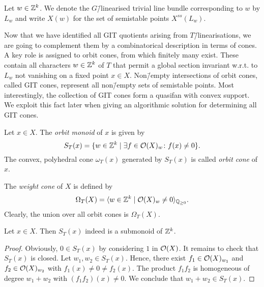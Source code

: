 \begin{notation}
	Let $w\in\mathbb{Z}^k$. We denote the $G$\=/linearised trivial line bundle corresponding to $w$ by $L_w$ and write $X(w)$ for the set of semistable points $X^{ss}(L_w)$.
\end{notation}

Now that we have identified all GIT quotients arising from $T$\=/linearisations, we are going to complement them by a combinatorical description in terms of cones. A key role is assigned to orbit cones, from which finitely many exist. These contain all characters $w\in\mathbb{Z}^k$ of $T$ that permit a global section invariant w.r.t. to $L_w$ not vanishing on a fixed point $x\in X$. Non\=/empty intersections of orbit cones, called GIT cones, represent all non\=/empty sets of semistable points. Most interestingly, the collection of GIT cones form a quasifan with convex support. We exploit this fact later when giving an algorithmic solution for determining all GIT cones.

\begin{defi}
	\label{defi:orbit_cone}
	Let $x\in X$. The \emph{orbit monoid} of $x$ is given by
	$$S_T(x) = \{w\in\mathbb{Z}^k\mid \exists f\in\mathcal{O}(X)_w\colon f(x) \neq 0\}.$$
	The convex, polyhedral cone $\omega_T(x)$ generated by $S_T(x)$ is called \emph{orbit cone} of $x$.
	
	The \emph{weight cone} of $X$ is defined by
	$$\Omega_T(X) = \langle w\in\mathbb{Z}^k\mid \mathcal{O}(X)_w \neq 0 \rangle_{\mathbb{Q}_{\geq 0}}.$$
	Clearly, the union over all orbit cones is $\Omega_T(X)$.
\end{defi}

\begin{lemma}
	Let $x\in X$. Then $S_T(x)$ indeed is a submonoid of $\mathbb{Z}^k$.
\end{lemma}
\begin{proof}
	Obviously, $0\in S_T(x)$ by considering $1$ in $\mathcal{O}(X)$. It remains to check that $S_T(x)$ is closed. Let $w_1, w_2\in S_T(x)$. Hence, there exist $f_1\in\mathcal{O}(X)_{w_1}$ and $f_2\in\mathcal{O}(X)_{w_2}$ with $f_1(x) \neq 0 \neq f_2(x)$.
	The product $f_1f_2$ is homogeneous of degree $w_1+w_2$ with $(f_1f_2)(x) \neq 0$. We conclude that $w_1+w_2\in S_T(x)$.
\end{proof}

